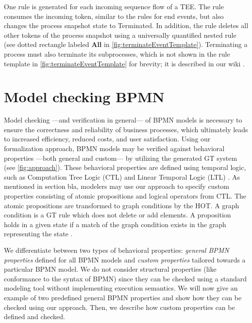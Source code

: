 \documentclass{lmcs} %
\begin{document}
One rule is generated for each incoming sequence flow of a TEE.
The rule consumes the incoming token, similar to the rules for end events, but also changes the process snapshot state to \textsf{Terminated}.
In addition, the rule deletes all other tokens of the process snapshot using a universally quantified nested rule (see dotted rectangle labeled \textbf{All} in \autoref{fig:terminateEventTemplate}).
Terminating a process must also terminate its subprocesses, which is not shown in the rule template in \autoref{fig:terminateEventTemplate} for brevity; it is described in our wiki \cite{timkrauterLMCS2024Artifacts2023}.

\section{Model checking BPMN} \label{sec:modelChecking}

Model checking ---and verification in general--- of BPMN models is necessary to ensure the correctness and reliability of business processes, which ultimately leads to increased efficiency, reduced costs, and user satisfaction.
Using our formalization approach, BPMN models may be verified against behavioral properties ---both general and custom--- by utilizing the generated GT system (see \autoref{fig:approach}).
These behavioral properties are defined using temporal logic, such as Computation Tree Logic (CTL) and Linear Temporal Logic (LTL) \cite{baierPrinciplesModelChecking2008}.
As mentioned in section bla, modelers may use our approach to specify custom properties consisting of atomic propositions and logical operators from CTL.
The atomic propositions are transformed to graph conditions by the HOT.
A graph condition is a GT rule which does not delete or add elements.
A proposition holds in a given state if a match of the graph condition exists in the graph representing the state \cite{kastenbergModelCheckingDynamic2006}.

We differentiate between two types of behavioral properties: \textit{general BPMN properties} defined for all BPMN models and \textit{custom properties} tailored towards a particular BPMN model.
We do not consider structural properties (like conformance to the syntax of BPMN) since they can be checked using a standard modeling tool without implementing execution semantics.
We will now give an example of two predefined general BPMN properties and show how they can be checked using our approach.
Then, we describe how custom properties can be defined and checked.
\end{document}
